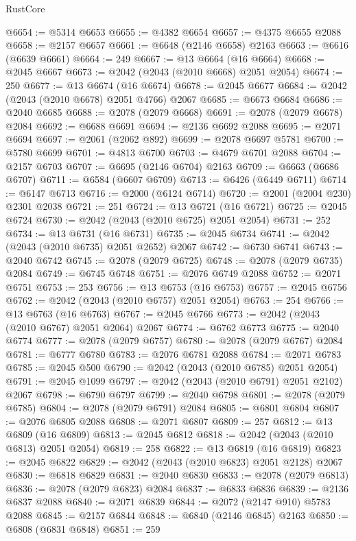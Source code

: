 \begin{lexlean}{RustCore}
\begin{coremodule}
@6654 := @5314 @6653
@6655 := @4382 @6654
@6657 := @4375 @6655 @2088
@6658 := @2157 @6657
@6661 := @6648 (@2146 @6658) @2163
@6663 := @6616 (@6639 @6661)
@6664 := 249
@6667 := @13 @6664 (@16 @6664)
@6668 := @2045 @6667
@6673 := @2042 (@2043 (@2010 @6668) @2051 @2054)
@6674 := 250
@6677 := @13 @6674 (@16 @6674)
@6678 := @2045 @6677
@6684 := @2042 (@2043 (@2010 @6678) @2051 @4766) @2067
@6685 := @6673 @6684
@6686 := @2040 @6685
@6688 := @2078 (@2079 @6668)
@6691 := @2078 (@2079 @6678) @2084
@6692 := @6688 @6691
@6694 := @2136 @6692 @2088
@6695 := @2071 @6694
@6697 := @2061 (@2062 @892)
@6699 := @2078 @6697 @5781
@6700 := @5780 @6699
@6701 := @4813 @6700
@6703 := @4679 @6701 @2088
@6704 := @2157 @6703
@6707 := @6695 (@2146 @6704) @2163
@6709 := @6663 (@6686 @6707)
@6711 := @6584 (@6607 @6709)
@6713 := @6426 (@6449 @6711)
@6714 := @6147 @6713
@6716 := @2000 (@6124 @6714)
@6720 := @2001 (@2004 @230) @2301 @2038
@6721 := 251
@6724 := @13 @6721 (@16 @6721)
@6725 := @2045 @6724
@6730 := @2042 (@2043 (@2010 @6725) @2051 @2054)
@6731 := 252
@6734 := @13 @6731 (@16 @6731)
@6735 := @2045 @6734
@6741 := @2042 (@2043 (@2010 @6735) @2051 @2652) @2067
@6742 := @6730 @6741
@6743 := @2040 @6742
@6745 := @2078 (@2079 @6725)
@6748 := @2078 (@2079 @6735) @2084
@6749 := @6745 @6748
@6751 := @2076 @6749 @2088
@6752 := @2071 @6751
@6753 := 253
@6756 := @13 @6753 (@16 @6753)
@6757 := @2045 @6756
@6762 := @2042 (@2043 (@2010 @6757) @2051 @2054)
@6763 := 254
@6766 := @13 @6763 (@16 @6763)
@6767 := @2045 @6766
@6773 := @2042 (@2043 (@2010 @6767) @2051 @2064) @2067
@6774 := @6762 @6773
@6775 := @2040 @6774
@6777 := @2078 (@2079 @6757)
@6780 := @2078 (@2079 @6767) @2084
@6781 := @6777 @6780
@6783 := @2076 @6781 @2088
@6784 := @2071 @6783
@6785 := @2045 @500
@6790 := @2042 (@2043 (@2010 @6785) @2051 @2054)
@6791 := @2045 @1099
@6797 := @2042 (@2043 (@2010 @6791) @2051 @2102) @2067
@6798 := @6790 @6797
@6799 := @2040 @6798
@6801 := @2078 (@2079 @6785)
@6804 := @2078 (@2079 @6791) @2084
@6805 := @6801 @6804
@6807 := @2076 @6805 @2088
@6808 := @2071 @6807
@6809 := 257
@6812 := @13 @6809 (@16 @6809)
@6813 := @2045 @6812
@6818 := @2042 (@2043 (@2010 @6813) @2051 @2054)
@6819 := 258
@6822 := @13 @6819 (@16 @6819)
@6823 := @2045 @6822
@6829 := @2042 (@2043 (@2010 @6823) @2051 @2128) @2067
@6830 := @6818 @6829
@6831 := @2040 @6830
@6833 := @2078 (@2079 @6813)
@6836 := @2078 (@2079 @6823) @2084
@6837 := @6833 @6836
@6839 := @2136 @6837 @2088
@6840 := @2071 @6839
@6844 := @2072 (@2147 @910) @5783 @2088
@6845 := @2157 @6844
@6848 := @6840 (@2146 @6845) @2163
@6850 := @6808 (@6831 @6848)
@6851 := 259

\end{coremodule}
\end{lexlean}
